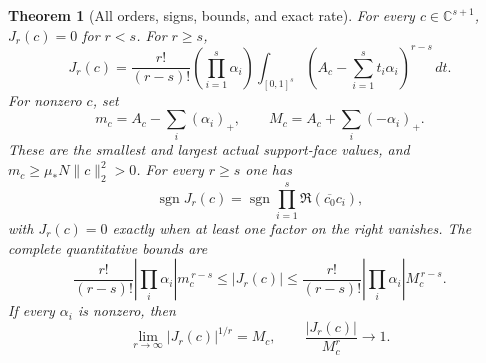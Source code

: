 \documentclass[11pt,a4paper]{article}
\newtheorem{theorem}{Theorem}[section]
\theoremstyle{definition}\newtheorem{definition}[theorem]{Definition}
\newcommand{\C}{\mathbb C}\newcommand{\R}{\mathbb R}
\providecommand{\sgn}{\operatorname{sgn}}
\begin{document}
\begin{theorem}[All orders, signs, bounds, and exact rate]
\label{fms:fms:higher}
For every $c\in\C^{s+1}$, $J_r(c)=0$ for $r<s$.
For $r\ge s$,
\begin{equation}\tag{FMS38}\label{fms:fms:integral}
 J_r(c)=\frac{r!}{(r-s)!}\left(\prod_{i=1}^s\alpha_i\right)
 \int_{[0,1]^s}
          \left(A_c-\sum_{i=1}^s t_i\alpha_i\right)^{r-s}\,dt.
\end{equation}
For nonzero $c$, set
\begin{equation}\tag{FMS39}\label{fms:fms:minmax}
 m_c=A_c-\sum_i(\alpha_i)_+,\qquad
 M_c=A_c+\sum_i(-\alpha_i)_+.
\end{equation}
These are the smallest and largest actual support-face values,
and $m_c\ge\mu_*N\|c\|_2^2>0$.
For every $r\ge s$ one has
\begin{equation}\tag{FMS40}\label{fms:fms:sign}
 \sgn J_r(c)=
   \sgn\prod_{i=1}^s\Re(\overline{c_0}c_i),
\end{equation}
with $J_r(c)=0$ exactly when at least one factor on the right
vanishes. The complete quantitative bounds are
\begin{equation}\tag{FMS41}\label{fms:fms:bounds}
 \frac{r!}{(r-s)!}\left|\prod_i\alpha_i\right|m_c^{\,r-s}
 \le |J_r(c)|\le
 \frac{r!}{(r-s)!}\left|\prod_i\alpha_i\right|M_c^{\,r-s}.
\end{equation}
If every $\alpha_i$ is nonzero, then
\begin{equation}\tag{FMS42}\label{fms:fms:rate}
 \lim_{r\to\infty}|J_r(c)|^{1/r}=M_c,\qquad
 \frac{|J_r(c)|}{M_c^r}\longrightarrow1.
\end{equation}
\end{theorem}
\end{document}

